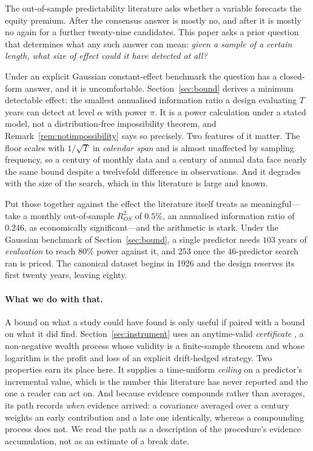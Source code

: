 \documentclass{article}
\theoremstyle{plain}
\theoremstyle{definition}
\newcommand{\rsq}{R^2_{OS}}
\begin{document}
The out-of-sample predictability literature asks whether a variable forecasts the equity
premium. After \citet{welch2008} the consensus answer is mostly no, and after
\citet{goyal2024} it is mostly no again for a further twenty-nine candidates. This paper asks
a prior question that determines what any such answer can mean: \emph{given a sample of a
certain length, what size of effect could it have detected at all?}

Under an explicit Gaussian constant-effect benchmark the question has a closed-form answer, and
it is uncomfortable. Section~\ref{sec:bound} derives a minimum detectable effect: the smallest
annualised information ratio a design evaluating $T$ years can detect at level $\alpha$ with
power $\pi$. It is a power calculation under a stated model, not a distribution-free
impossibility theorem, and Remark~\ref{rem:notimpossibility} says so precisely. Two features of
it matter. The floor scales with
$1/\sqrt{T}$ in \emph{calendar span} and is almost unaffected by sampling frequency, so a
century of monthly data and a century of annual data face nearly the same bound despite a
twelvefold difference in observations. And it degrades with the size of the search, which in
this literature is large and known.

Put those together against the effect the literature itself treats as meaningful---%
\citet{campbell2008} take a monthly out-of-sample $\rsq$ of $0.5\%$, an annualised information
ratio of $0.246$, as economically significant---and the arithmetic is stark. Under the
Gaussian benchmark of Section~\ref{sec:bound}, a single predictor needs $103$ years of
\emph{evaluation} to reach $80\%$ power against it, and $253$ once the $46$-predictor search
\citet{goyal2024} ran is priced. The canonical dataset begins in 1926 and the design reserves
its first twenty years, leaving eighty.

\paragraph{What we do with that.} A bound on what a study could have found is only useful if
paired with a bound on what it did find. Section~\ref{sec:instrument} uses an anytime-valid
\emph{certificate} \citep{guven2026}, a non-negative wealth process whose validity is a
finite-sample theorem and whose logarithm is the profit and loss of an explicit drift-hedged
strategy. Two properties earn its place here. It supplies a time-uniform \emph{ceiling} on a
predictor's incremental value, which is the number this literature has never reported and the
one a reader can act on. And because evidence compounds rather than averages, its path records
\emph{when} evidence arrived: a covariance averaged over a century weights an early
contribution and a late one identically, whereas a compounding process does not. We read the
path as a description of the procedure's evidence accumulation, not as an estimate of a
break date.
\end{document}
